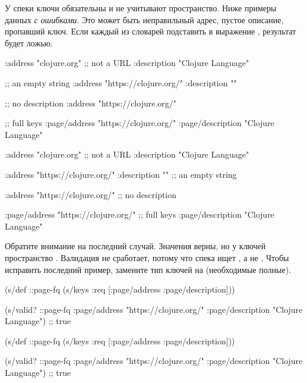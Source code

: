 У спеки  ключи обязательны и не учитывают пространство. Ниже
примеры данных \emph{с ошибками}. Это может быть неправильный адрес, пустое
описание, пропавший ключ. Если каждый из словарей подставить в выражение
, результат будет ложью.

\ifnarrow


\begin{clojure}
{:address "clojure.org" ;; not a URL
 :description "Clojure Language"}

;; an empty string
{:address "https://clojure.org/"
 :description ""}

;; no description
{:address "https://clojure.org/"}

 ;; full keys
{:page/address "https://clojure.org/"
 :page/description "Clojure Language"}
\end{clojure}


\else


\begin{clojure}
{:address "clojure.org" ;; not a URL
 :description "Clojure Language"}

{:address "https://clojure.org/"
 :description ""} ;; an empty string

{:address "https://clojure.org/"} ;; no description

{:page/address "https://clojure.org/" ;; full keys
 :page/description "Clojure Language"}
\end{clojure}


\fi

Обратите внимание на последний случай. Значения верны, но у ключей пространство
. Валидация не сработает, потому что спека ищет ,
а не . Чтобы исправить последний пример, замените тип
ключей  на  (необходимые полные).


\pagebreaklarge

\ifnarrow


\begin{clojure}
(s/def ::page-fq
  (s/keys :req [:page/address
                :page/description]))

(s/valid? ::page-fq
  {:page/address "https://clojure.org/"
   :page/description "Clojure Language"})
;; true
\end{clojure}


\else


\begin{clojure}
(s/def ::page-fq
  (s/keys :req [:page/address
                :page/description]))

(s/valid? ::page-fq
          {:page/address "https://clojure.org/"
           :page/description "Clojure Language"})
;; true
\end{clojure}


